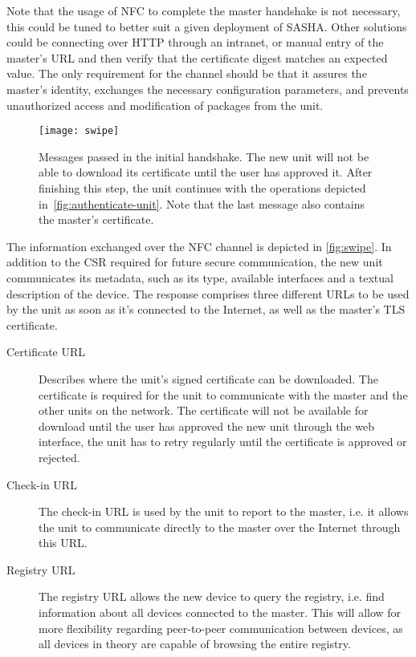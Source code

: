 Note that the usage of NFC to complete the master handshake is not necessary, this could be tuned to better suit a given deployment of SASHA. Other solutions could be connecting over HTTP through an intranet, or manual entry of the master's URL and then verify that the certificate digest matches an expected value. The only requirement for the channel should be that it assures the master's identity, exchanges the necessary configuration parameters, and prevents unauthorized access and modification of packages from the unit.

\begin{figure}[ht]
    \centering
    \texttt{[image: swipe]}
    \caption{Messages passed in the initial handshake. The new unit will not be able to download its certificate until the user has approved it. After finishing this step, the unit continues with the operations depicted in~\autoref{fig:authenticate-unit}. Note that the last message also contains the master's certificate.}
    \label{fig:swipe}
\end{figure}

The information exchanged over the NFC channel is depicted in \autoref{fig:swipe}. In addition to the CSR required for future secure communication, the new unit communicates its metadata, such as its type, available interfaces and a textual description of the device. The response comprises three different URLs to be used by the unit as soon as it's connected to the Internet, as well as the master's TLS certificate.

\begin{description}
\item[Certificate URL]
    Describes where the unit's signed certificate can be downloaded. The certificate is required for the unit to communicate with the master and the other units on the network. The certificate will not be available for download until the user has approved the new unit through the web interface, the unit has to retry regularly until the certificate is approved or rejected.
\item[Check-in URL]
    The check-in URL is used by the unit to report to the master, i.e. it allows the unit to communicate directly to the master over the Internet through this URL.
\item[Registry URL]
    The registry URL allows the new device to query the registry, i.e. find information about all devices connected to the master. This will allow for more flexibility regarding peer-to-peer communication between devices, as all devices in theory are capable of browsing the entire registry.
\end{description}

